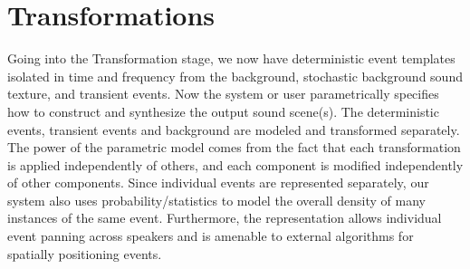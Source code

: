 \documentclass[review]{acmsiggraph}      %
\begin{document}



\section{Transformations}

Going into the Transformation stage, we now have deterministic event 
templates isolated in time and frequency from the 
background, stochastic background sound texture, and transient events.
Now the system or user parametrically specifies how to 
construct and synthesize the output sound scene(s). The deterministic 
events, transient events and background are modeled and transformed 
separately. The power of the parametric model comes from the 
fact that each transformation is applied independently of others, and each component is 
modified independently of other components. 
Since individual events are represented separately, our system also uses 
probability/statistics to model the overall density of many instances of the same event. 
Furthermore, the representation allows individual event panning across speakers and is 
amenable to external algorithms for spatially positioning events. 
\end{document}
